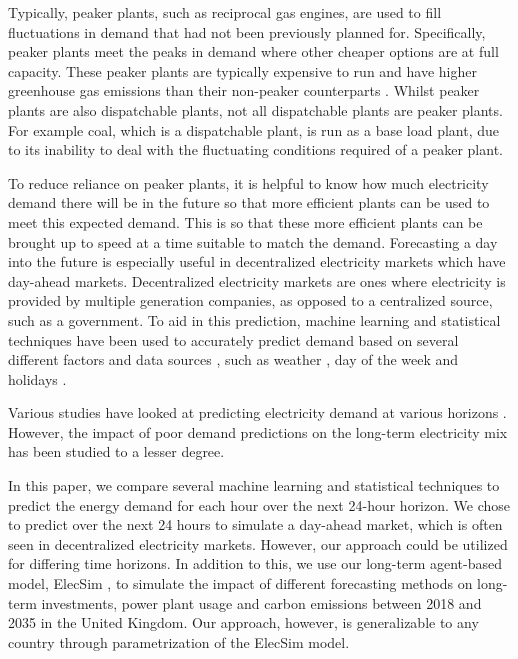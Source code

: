 \documentclass[final,3p,times,twocolumn,numbers]{elsarticle}
\begin{document}
Typically, peaker plants, such as reciprocal gas engines, are used to fill fluctuations in demand that had not been previously planned for. Specifically, peaker plants meet the peaks in demand where other cheaper options are at full capacity. These peaker plants are typically expensive to run and have higher greenhouse gas emissions than their non-peaker counterparts \cite{Mahmood2014}. Whilst peaker plants are also dispatchable plants, not all dispatchable plants are peaker plants. For example coal, which is a dispatchable plant, is run as a base load plant, due to its inability to deal with the fluctuating conditions required of a peaker plant.

To reduce reliance on peaker plants, it is helpful to know how much electricity demand there will be in the future so that more efficient plants can be used to meet this expected demand. This is so that these more efficient plants can be brought up to speed at a time suitable to match the demand. Forecasting a day into the future is especially useful in decentralized electricity markets which have day-ahead markets. Decentralized electricity markets are ones where electricity is provided by multiple generation companies, as opposed to a centralized source, such as a government. To aid in this prediction, machine learning and statistical techniques have been used to accurately predict demand based on several different factors and data sources \cite{Kell2018a}, such as weather \cite{Hong2014}, day of the week \cite{Al-Musaylh2018} and holidays \cite{Vrablecova2017}. 




Various studies have looked at predicting electricity demand at various horizons \cite{Singh2012,Huang2003,Andersen2013}. However, the impact of poor demand predictions on the long-term electricity mix has been studied to a lesser degree.

In this paper, we compare several machine learning and statistical techniques to predict the energy demand for each hour over the next 24-hour horizon. We chose to predict over the next 24 hours to simulate a day-ahead market, which is often seen in decentralized electricity markets. However, our approach could be utilized for differing time horizons. In addition to this, we use our long-term agent-based model, ElecSim \cite{Kell, Kell2020}, to simulate the impact of different forecasting methods on long-term investments, power plant usage and carbon emissions between 2018 and 2035 in the United Kingdom. Our approach, however, is generalizable to any country through parametrization of the ElecSim model.
\end{document}
